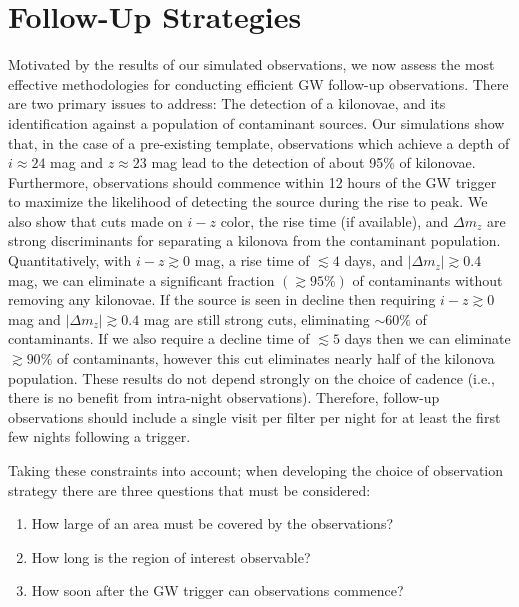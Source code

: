 \section{Follow-Up Strategies}
\label{sec:ch2_disc}
Motivated by the results of our simulated observations, we now assess the most effective methodologies for conducting efficient GW follow-up observations. There are two primary issues to address: The detection of a kilonovae, and its identification against a population of contaminant sources. Our simulations show that, in the case of a pre-existing template, observations which achieve a depth of $i\approx24$ mag and $z\approx23$ mag lead to the detection of about 95\% of kilonovae. Furthermore, observations should commence within 12 hours of the GW trigger to maximize the likelihood of detecting the source during the rise to peak. We also show that cuts made on $i-z$ color, the rise time (if available), and $\Delta m_z$ are strong discriminants for separating a kilonova from the contaminant population. Quantitatively, with $i-z\gtrsim0$ mag, a rise time of $\lesssim 4$ days, and $|\Delta m_z| \gtrsim 0.4$ mag, we can eliminate a significant fraction $(\gtrsim95\%)$ of contaminants without removing any kilonovae. If the source is seen in decline then requiring $i-z\gtrsim0$ mag and $|\Delta m_z| \gtrsim 0.4$ mag are still strong cuts, eliminating $\sim60\%$ of contaminants. If we also require a decline time of $\lesssim 5$ days then we can eliminate $\gtrsim 90\%$ of contaminants, however this cut eliminates nearly half of the kilonova population. These results do not depend strongly on the choice of cadence (i.e., there is no benefit from intra-night observations). Therefore, follow-up observations should include a single visit per filter per night for at least the first few nights following a trigger.

\clearpage
Taking these constraints into account; when developing the choice of observation strategy there are three questions that must be considered:
\begin{enumerate}
\item How large of an area must be covered by the observations?
\item How long is the region of interest observable? 
\item How soon after the GW trigger can observations commence?
\end{enumerate}

